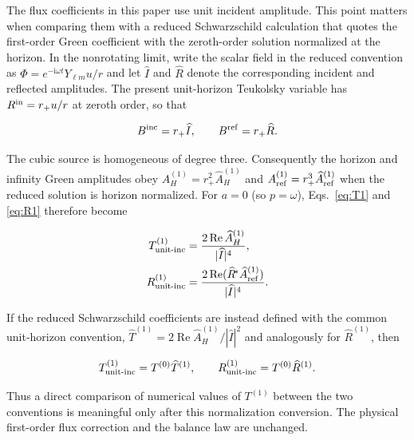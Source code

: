 \documentclass[aps,prd,twocolumn,10pt,nofootinbib,superscriptaddress,floatfix]{revtex4-2}
\newcommand{\ii}{\mathrm{i}}
\begin{document}
The flux coefficients in this paper use unit incident amplitude.  This
point matters when comparing them with a reduced Schwarzschild calculation
that quotes the first-order Green coefficient with the zeroth-order solution
normalized at the horizon.  In the nonrotating limit, write the scalar field
in the reduced convention as $\Phi=e^{-\ii\omega t}Y_{\ell m}u/r$ and let
$\widehat I$ and $\widehat R$ denote the corresponding incident and reflected
amplitudes.  The present unit-horizon Teukolsky variable has
$R^{\rm in}=r_+u/r$ at zeroth order, so that

\begin{equation}
B^{\rm inc}=r_+\widehat I,\qquad
B^{\rm ref}=r_+\widehat R .
\end{equation}

The cubic source is homogeneous of degree three.  Consequently the horizon
and infinity Green amplitudes obey
$A_H^{(1)}=r_+^2\widehat A_H^{(1)}$ and
$A_{\rm ref}^{(1)}=r_+^3\widehat A_{\rm ref}^{(1)}$ when the reduced solution is
horizon normalized.  For $a=0$ (so $p=\omega$), Eqs.~\eqref{eq:T1} and
\eqref{eq:R1} therefore become

\begin{align}
T_{\rm unit\text{-}inc}^{(1)}
&=\frac{2\operatorname{Re}\widehat A_H^{(1)}}{|\widehat I|^4},
\\
R_{\rm unit\text{-}inc}^{(1)}
&=\frac{2\operatorname{Re}
 (\widehat R^{\!*}\widehat A_{\rm ref}^{(1)})}{|\widehat I|^4}.
\end{align}

If the reduced Schwarzschild coefficients are instead defined with the common
unit-horizon convention,
$\widehat T^{(1)}=2\operatorname{Re}\widehat A_H^{(1)}/|\widehat I|^2$
and analogously for $\widehat R^{(1)}$, then

\begin{equation}
T_{\rm unit\text{-}inc}^{(1)}=T^{(0)}\widehat T^{(1)},
\qquad
R_{\rm unit\text{-}inc}^{(1)}=T^{(0)}\widehat R^{(1)}.
\end{equation}

Thus a direct comparison of numerical values of $T^{(1)}$ between the two
conventions is meaningful only after this normalization conversion.  The physical
first-order flux correction and the balance law are unchanged.
\end{document}
